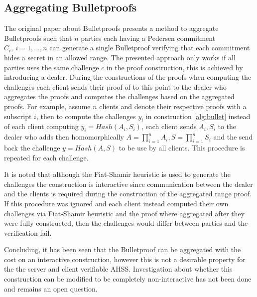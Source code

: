 




\subsection*{Aggregating Bulletproofs}
 The original paper about Bulletproofs \cite{bulletProofs_theory} presents a method to aggregate Bulletproofs such that $n$ parties each having a Pedersen commitment $C_i,\: i=1,...,n$ can generate a single Bulletproof verifying that each commitment hides a secret in an allowed range. The presented approach only works if all parties uses the same challenge $c$ in the proof construction, this is achieved by introducing a dealer. During the constructions of the proofs when computing the challenges each client sends their proof of to this point to the dealer who aggregates the proofs and computes the challenges based on the aggregated proofs. For example, assume $n$ clients and denote their respective proofs with a subscript $i$, then to compute the challenges $y_i$ in construction \ref{alg:bullet} instead of each client computing $y_i = Hash(A_i,S_i)$, each client sends $A_i,S_i$ to the dealer who adds then homomorphically $A = \prod_{i=1}^n A_i, S = \prod_{i=1}^n S_i$ and the send back the challenge $y =Hash(A,S)$ to be use by all clients. This procedure is repeated for each challenge. 
 
 It is noted that although the Fiat-Shamir heuristic is used to generate the challenges the construction is interactive since communication between the dealer and the clients is required during the construction of the aggregated range proof. If this procedure was ignored and each client instead computed their own challenges via Fiat-Shamir heuristic and the proof where aggregated after they were fully constructed,  then the challenges would differ between parties and the verification fail. 

Concluding, it has been seen that the  Bulletproof can be aggregated with the cost on an  interactive construction, however this is not a desirable property for the the server and client verifiable AHSS. Investigation about whether this construction can be modified to be completely non-interactive has not been done and remains an open question.  

